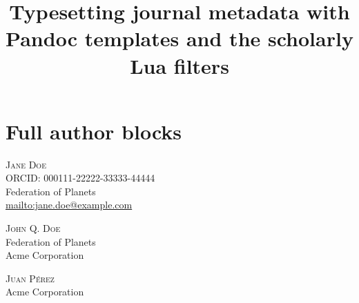 \documentclass{article}
\title{Typesetting journal metadata with Pandoc templates and the scholarly Lua filters}
\begin{document}
\maketitle

\section{Full author blocks}

{\scshape Jane Doe}%
\\ORCID: 000111-22222-33333-44444%
\\Federation of Planets%
\\\href{jane.doe@example.com}{mailto:jane.doe@example.com}%

{\scshape John Q. Doe}%
%
\\Federation of Planets\\Acme Corporation%
%

{\scshape Juan Pérez}%
%
\\Acme Corporation%
%
\end{document}
